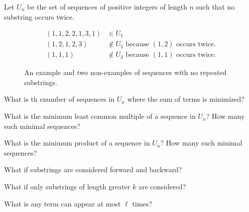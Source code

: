\documentclass{article}
\begin{document}
  Let $U_n$ be the set of sequences of positive integers of length $n$ such that
  no substring occurs twice.
\begin{figure}[!h]
  \centering
  \begin{align}
    (1, 1, 2, 2, 1, 3, 1) &\in U_7\\
    (1, 2, 1, 2, 3) &\not\in U_5 \text{ because } (1, 2) \text{ occurs twice.}\\
    (1, 1, 1) &\not\in U_3 \text{ because } (1, 1) \text{ occurs twice.}
  \end{align}
  \caption{
    An example and two non-examples of sequences with no repeated substrings.
  }
\end{figure}

\begin{question}
  What is th enumber of sequences in $U_n$ where the sum of terms is minimized?
\end{question}

\begin{related}
  \item What is the minimum least common multiple of a sequence in $U_n$?
    How many such minimal sequences?
  \item What is the minimum product of a sequence in $U_n$?
    How many such minimal sequences?
  \item What if substrings are considered forward and backward?
  \item What if only substrings of length greater $k$ are considered?
  \item What is any term can appear at most $\ell$ times?
\end{related}
\end{document}
